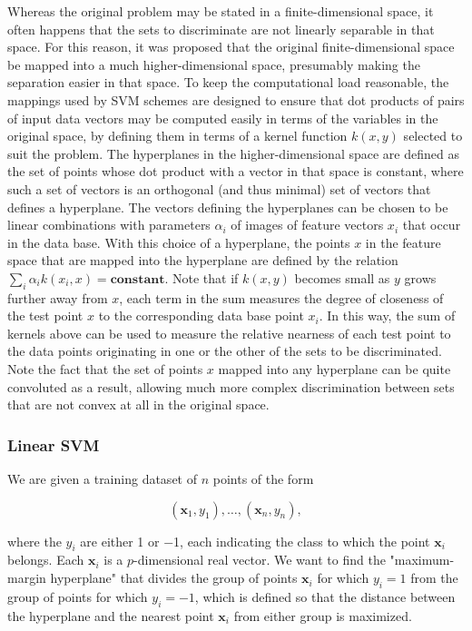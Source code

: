 Whereas the original problem may be stated in a finite-dimensional space, it often happens that the sets to discriminate are not linearly separable in that space. For this reason, it was proposed that the original finite-dimensional space be mapped into a much higher-dimensional space, presumably making the separation easier in that space. To keep the computational load reasonable, the mappings used by SVM schemes are designed to ensure that dot products of pairs of input data vectors may be computed easily in terms of the variables in the original space, by defining them in terms of a kernel function \(k(x, y)\) selected to suit the problem. The hyperplanes in the higher-dimensional space are defined as the set of points whose dot product with a vector in that space is constant, where such a set of vectors is an orthogonal (and thus minimal) set of vectors that defines a hyperplane. The vectors defining the hyperplanes can be chosen to be linear combinations with parameters \(\alpha_i\) of images of feature vectors \(x_i\) that occur in the data base. With this choice of a hyperplane, the points \(x\) in the feature space that are mapped into the hyperplane are defined by the relation \(\textstyle\sum_i \alpha_i k(x_i, x) = \textbf{constant}.\)  Note that if  \(k(x, y)\) becomes small as \(y\) grows further away from \(x\), each term in the sum measures the degree of closeness of the test point \(x\) to the corresponding data base point \(x_i\). In this way, the sum of kernels above can be used to measure the relative nearness of each test point to the data points originating in one or the other of the sets to be discriminated. Note the fact that the set of points \(x\) mapped into any hyperplane can be quite convoluted as a result, allowing much more complex discrimination between sets that are not convex at all in the original space.
\\

\subsubsection{\textbf{Linear SVM}}
We are given a training dataset of \(n\) points of the form

\[(\mathbf{x}_1, y_1), \ldots, (\mathbf{x}_n, y_n),\]

where the \(y_i\) are either 1 or −1, each indicating the class to which the point \(\mathbf{x}_i\) belongs. Each \(\mathbf{x}_i\) is a \(p\)-dimensional real vector. We want to find the "maximum-margin hyperplane" that divides the group of points \(\mathbf{x}_i\) for which \(y_i = 1\) from the group of points for which \(y_i = -1\), which is defined so that the distance between the hyperplane and the nearest point \(\mathbf{x}_i\)  from either group is maximized.
\\

